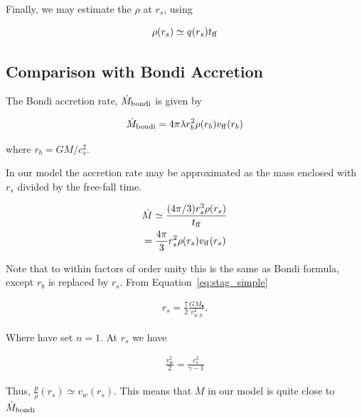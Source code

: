 \documentclass[usenatbib,fleqn]{mn2e}
\newcommand{\Mdotb}{\dot{M}_{\rm bondi}}
\newcommand{\rs}{r_s}
\newcommand{\rb}{r_b}
\newcommand{\vw}{v_w}
\newcommand{\kew}{\frac{v_w^2}{2}}
\newcommand{\cs}{\frac{p}{\rho}}
\newcommand{\Mbh}[1][]{M_{\bullet#1}}
\newcommand{\ff}{\rm ff}
\newcommand{\tff}{t_{\ff}}
\newcommand{\vwO}{v_{w,0}}
\begin{document}
Finally, we may estimate the $\rho$ at $\rs$, using 

\begin{equation}
\rho(\rs)\simeq q(\rs) \tff
\end{equation}



\subsection{Comparison with Bondi Accretion}
The Bondi accretion rate, $\Mdotb$ is given by 

\begin{align}
\Mdotb=4\pi \lambda r_b^2 \rho(r_b) v_{\rm ff}(r_b)
\end{align}

where $r_b=G M/c_s^2$.

In our model the accretion rate may be approximated as the mass enclosed with $\rs$ divided by the free-fall time.

\begin{align}
&\dot{M}\simeq\frac{(4 \pi/3) \rs^3 \rho(\rs)}{t_{\ff}}\\
&=\frac{4 \pi}{3} \rs^2 \rho(\rs) v_{\ff}(\rs)
\end{align}

Note that to within factors of order unity this is the same as Bondi formula, except $\rb$ is replaced by $\rs$. 
From Equation~\ref{eq:stag_simple}

\begin{align}
\rs=\frac{7}{2}\frac{G \Mbh}{\vwO^2}.
\label{eq:rs_simple}
\end{align}

Where have set $n=1$.  At $\rs$ we have

\begin{align}
\kew=\frac{c_s^2}{\gamma-1}
\end{align}

Thus, $\cs(\rs)\simeq \vw(\rs)$. This means that $\dot{M}$ in our model is quite close to $\Mdotb$


\end{document}
